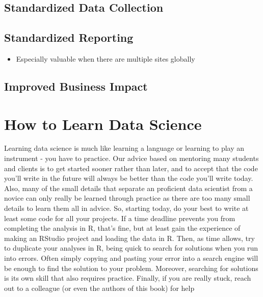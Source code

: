\documentclass[
]{book}
\providecommand{\tightlist}{%
  \setlength{\itemsep}{0pt}\setlength{\parskip}{0pt}}
\begin{document}
\hypertarget{standardized-data-collection}{%
\subsection{Standardized Data Collection}\label{standardized-data-collection}}

\hypertarget{standardized-reporting}{%
\subsection{Standardized Reporting}\label{standardized-reporting}}

\begin{itemize}
\tightlist
\item
  Especially valuable when there are multiple sites globally
\end{itemize}

\hypertarget{improved-business-impact}{%
\subsection{Improved Business Impact}\label{improved-business-impact}}

\hypertarget{how-to-learn-data-science}{%
\section{How to Learn Data Science}\label{how-to-learn-data-science}}

Learning data science is much like learning a language or learning to play an instrument - you have to practice. Our advice based on mentoring many students and clients is to get started sooner rather than later, and to accept that the code you'll write in the future will always be better than the code you'll write today. Also, many of the small details that separate an proficient data scientist from a novice can only really be learned through practice as there are too many small details to learn them all in advice. So, starting today, do your best to write at least some code for all your projects. If a time deadline prevents you from completing the analysis in R, that's fine, but at least gain the experience of making an RStudio project and loading the data in R. Then, as time allows, try to duplicate your analyses in R, being quick to search for solutions when you run into errors. Often simply copying and pasting your error into a search engine will be enough to find the solution to your problem. Moreover, searching for solutions is its own skill that also requires practice. Finally, if you are really stuck, reach out to a colleague (or even the authors of this book) for help
\end{document}
